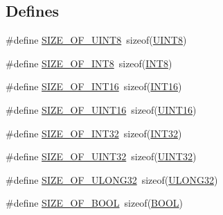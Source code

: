 \subsection*{Defines}
\begin{DoxyCompactItemize}
\item 
\#define \hyperlink{a00599_a634811c51bc3d3d55b574b3eefc99025}{SIZE\_\-OF\_\-UINT8}~sizeof(\hyperlink{a00660_gab27e9918b538ce9d8ca692479b375b6a}{UINT8})
\item 
\#define \hyperlink{a00599_a4aafb4570f293835708cc4b104df89cb}{SIZE\_\-OF\_\-INT8}~sizeof(\hyperlink{a00660_ga307b8734c020247f6bac4fcde0dcfbb9}{INT8})
\item 
\#define \hyperlink{a00599_a455564fd0dd201a9424e5114dad2d635}{SIZE\_\-OF\_\-INT16}~sizeof(\hyperlink{a00660_ga57de7cb8e702b1746127a4d5137fa455}{INT16})
\item 
\#define \hyperlink{a00599_ad2024c1c99e56ed26a41c381b40038d0}{SIZE\_\-OF\_\-UINT16}~sizeof(\hyperlink{a00660_ga09f1a1fb2293e33483cc8d44aefb1eb1}{UINT16})
\item 
\#define \hyperlink{a00599_ae3ed18c0021e8539119a2b31fa5b1112}{SIZE\_\-OF\_\-INT32}~sizeof(\hyperlink{a00660_ga63021d67d54286c2163bcdb43a6f2569}{INT32})
\item 
\#define \hyperlink{a00599_aba6ba1193a4f95d3156ea40aa71186e5}{SIZE\_\-OF\_\-UINT32}~sizeof(\hyperlink{a00660_gae1e6edbbc26d6fbc71a90190d0266018}{UINT32})
\item 
\#define \hyperlink{a00599_a5c7f6bdd54401ce871dbb0b691eb5440}{SIZE\_\-OF\_\-ULONG32}~sizeof(\hyperlink{a00660_gaa4ee7c96d5dff444cca1bf965c9f77fd}{ULONG32})
\item 
\#define \hyperlink{a00599_a9e5aa76cc9e0a06fb7f56ecd4de43635}{SIZE\_\-OF\_\-BOOL}~sizeof(\hyperlink{a00660_ga1f04022c0a182c51c059438790ea138c}{BOOL})
\end{DoxyCompactItemize}
